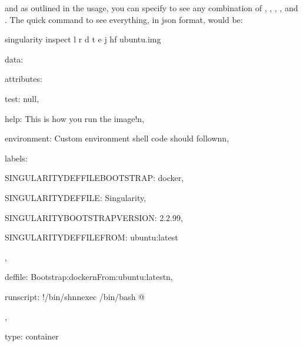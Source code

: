 \documentclass[letterpaper,10pt,english]{sphinxmanual}
\begin{document}
and as outlined in the usage, you can specify to see any combination of 
,  ,  ,  , and . The quick command to see everything, in json format, would
be:

%
\begin{sphinxVerbatim}[commandchars=\\\{\}]
\PYGZdl{} singularity inspect \PYGZhy{}l \PYGZhy{}r \PYGZhy{}d \PYGZhy{}t \PYGZhy{}e \PYGZhy{}j \PYGZhy{}hf ubuntu.img

\PYGZob{}

    \PYGZdq{}data\PYGZdq{}: \PYGZob{}

        \PYGZdq{}attributes\PYGZdq{}: \PYGZob{}

            \PYGZdq{}test\PYGZdq{}: null,

            \PYGZdq{}help\PYGZdq{}: \PYGZdq{}This is how you run the image!\PYGZbs{}n\PYGZdq{},

            \PYGZdq{}environment\PYGZdq{}: \PYGZdq{}\PYGZsh{} Custom environment shell code should follow\PYGZbs{}n\PYGZbs{}n\PYGZdq{},

            \PYGZdq{}labels\PYGZdq{}: \PYGZob{}

                \PYGZdq{}SINGULARITY\PYGZus{}DEFFILE\PYGZus{}BOOTSTRAP\PYGZdq{}: \PYGZdq{}docker\PYGZdq{},

                \PYGZdq{}SINGULARITY\PYGZus{}DEFFILE\PYGZdq{}: \PYGZdq{}Singularity\PYGZdq{},

                \PYGZdq{}SINGULARITY\PYGZus{}BOOTSTRAP\PYGZus{}VERSION\PYGZdq{}: \PYGZdq{}2.2.99\PYGZdq{},

                \PYGZdq{}SINGULARITY\PYGZus{}DEFFILE\PYGZus{}FROM\PYGZdq{}: \PYGZdq{}ubuntu:latest\PYGZdq{}

            \PYGZcb{},

            \PYGZdq{}deffile\PYGZdq{}: \PYGZdq{}Bootstrap:docker\PYGZbs{}nFrom:ubuntu:latest\PYGZbs{}n\PYGZdq{},

            \PYGZdq{}runscript\PYGZdq{}: \PYGZdq{}\PYGZsh{}!/bin/sh\PYGZbs{}n\PYGZbs{}nexec /bin/bash \PYGZbs{}\PYGZdq{}\PYGZdl{}@\PYGZbs{}\PYGZdq{}\PYGZdq{}

        \PYGZcb{},

        \PYGZdq{}type\PYGZdq{}: \PYGZdq{}container\PYGZdq{}

    \PYGZcb{}

\PYGZcb{}
\end{sphinxVerbatim}
\end{document}
